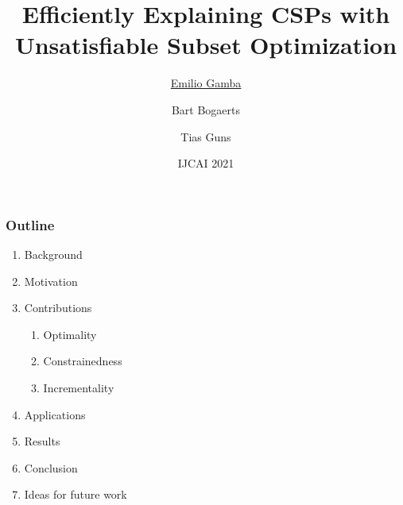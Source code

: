 \documentclass[handout]{beamer}
\title{Efficiently Explaining CSPs with Unsatisfiable Subset Optimization}
\institute[shortinst]
{\inst{1} Vrije Universiteit Brussel, Belgium \\ %
	\inst{2} KULeuven, Belgium \\ %
	\href{mailto:emilio.gamba@vub.be}{\underline{emilio.gamba@vub.be}}, \href{mailto:bart.bogaerts@vub.be}{bart.bogaerts@vub.be}, \href{mailto:tias.guns@kuleuven.be}{tias.guns@kuleuven.be} %
}
\date{IJCAI 2021}
\author{\underline{Emilio Gamba}\inst{1} \and  Bart Bogaerts\inst{1} \and   Tias Guns\inst{1,2}}
\begin{document}
	
	\begin{frame}
		\maketitle
	\end{frame}
	
	\begin{frame}
		\frametitle{Outline}
		
		\begin{enumerate}
			\item Background
			\item Motivation
			\item Contributions
			\begin{enumerate}
				\item {\color{vuborange}Optimality}
				\item {\color{vuborange}Constrainedness}
				\item {\color{vuborange}Incrementality}
			\end{enumerate}
			\item Applications
			\item Results
			\item Conclusion
			\item Ideas for future work
		\end{enumerate}
	\end{frame}
%	
\end{document}

